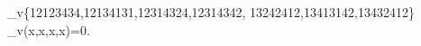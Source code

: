 \sum_{v\in\{12123434,12134131,12314324,12314342,
13242412,13413142,13432412\}}
 \nolimits_v(x,x,x,x)=0.
